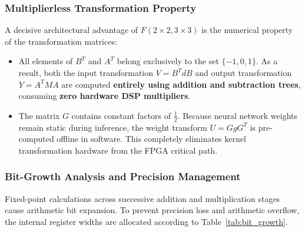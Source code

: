 \documentclass[12pt,a4paper]{article}
\begin{document}
\subsubsection{Multiplierless Transformation Property}
A decisive architectural advantage of $F(2 \times 2, 3 \times 3)$ is the numerical property of the transformation matrices:
\begin{itemize}
    \item All elements of $B^T$ and $A^T$ belong exclusively to the set $\{-1, 0, 1\}$. As a result, both the input transformation $V = B^T d B$ and output transformation $Y = A^T M A$ are computed \textbf{entirely using addition and subtraction trees}, consuming \textbf{zero hardware DSP multipliers}.
    \item The matrix $G$ contains constant factors of $\frac{1}{2}$. Because neural network weights remain static during inference, the weight transform $U = G g G^T$ is pre-computed offline in software. This completely eliminates kernel transformation hardware from the FPGA critical path.
\end{itemize}

\subsubsection{Bit-Growth Analysis and Precision Management}
Fixed-point calculations across successive addition and multiplication stages cause arithmetic bit expansion. To prevent precision loss and arithmetic overflow, the internal register widths are allocated according to Table~\ref{tab:bit_growth}.
\end{document}

